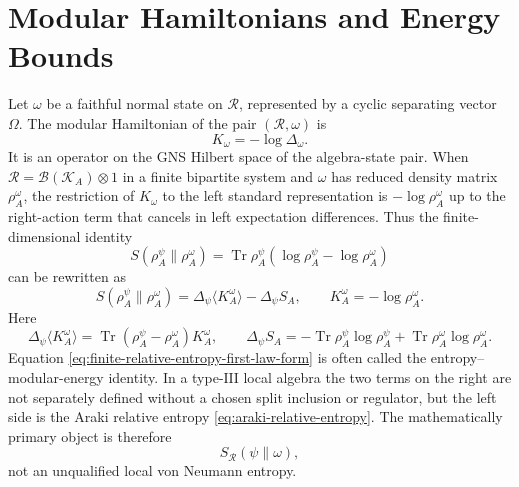 \section{Modular Hamiltonians and Energy Bounds}
\label{sec:modular-hamiltonian-relative-entropy-energy-bounds}

Let \(\omega\) be a faithful normal state on \(\mathcal R\), represented by a
cyclic separating vector \(\Omega\).  The modular Hamiltonian of the pair
\((\mathcal R,\omega)\) is
\[
  K_\omega=-\log\Delta_\omega .
\]
It is an operator on the GNS Hilbert space of the algebra-state pair.  When
\(\mathcal R=\mathcal B(\mathcal K_A)\otimes 1\) in a finite bipartite
system and \(\omega\) has reduced density matrix \(\rho_A^\omega\), the
restriction of \(K_\omega\) to the left standard representation is
\(-\log\rho_A^\omega\) up to the right-action term that cancels in left
expectation differences.  Thus the finite-dimensional identity
\[
  S(\rho_A^\psi\|\rho_A^\omega)
  =
  \operatorname{Tr}\rho_A^\psi
    (\log\rho_A^\psi-\log\rho_A^\omega)
\]
can be rewritten as
\begin{equation}
  S(\rho_A^\psi\|\rho_A^\omega)
  =
  \Delta_\psi\langle K_A^\omega\rangle
  -
  \Delta_\psi S_A,
  \qquad
  K_A^\omega=-\log\rho_A^\omega .
  \label{eq:finite-relative-entropy-first-law-form}
\end{equation}
Here
\[
  \Delta_\psi\langle K_A^\omega\rangle
  =
  \operatorname{Tr}(\rho_A^\psi-\rho_A^\omega)K_A^\omega,
  \qquad
  \Delta_\psi S_A
  =
  -\operatorname{Tr}\rho_A^\psi\log\rho_A^\psi
  +\operatorname{Tr}\rho_A^\omega\log\rho_A^\omega .
\]
Equation \eqref{eq:finite-relative-entropy-first-law-form} is often called
the entropy--modular-energy identity.  In a type-\(\mathrm{III}\) local
algebra the two terms on the right are not separately defined without a
chosen split inclusion or regulator, but the left side is the Araki relative
entropy \eqref{eq:araki-relative-entropy}.  The mathematically primary object
is therefore
\[
  S_{\mathcal R}(\psi\|\omega),
\]
not an unqualified local von Neumann entropy.

